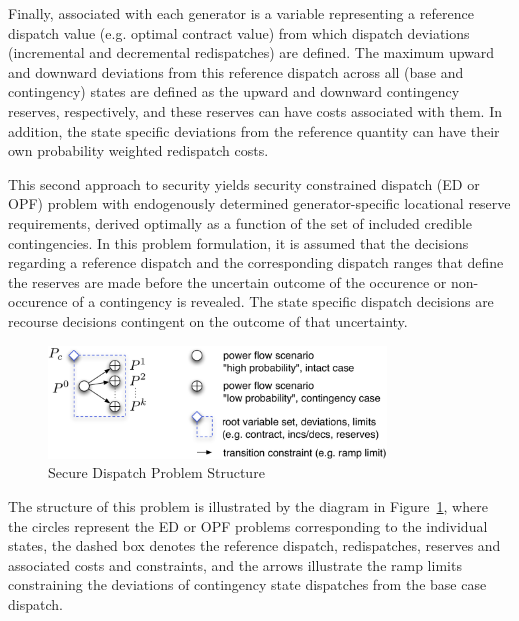 \documentclass[12pt]{article}
\numberwithin{equation}{section}
\numberwithin{table}{section}
\numberwithin{figure}{section}
\begin{document}
Finally, associated with each generator is a variable representing a reference dispatch value (e.g. optimal contract value) from which dispatch deviations (incremental and decremental redispatches) are defined. The maximum upward and downward deviations from this reference dispatch across all (base and contingency) states are defined as the upward and downward contingency reserves, respectively, and these reserves can have costs associated with them. In addition, the state specific deviations from the reference quantity can have their own probability weighted redispatch costs.

This second approach to security yields security constrained dispatch (ED or OPF) problem with endogenously determined generator-specific locational reserve requirements, derived optimally as a function of the set of included credible contingencies. In this problem formulation, it is assumed that the decisions regarding a reference dispatch and the corresponding dispatch ranges that define the reserves are made before the uncertain outcome of the occurence or non-occurence of a contingency is revealed. The state specific dispatch decisions are recourse decisions contingent on the outcome of that uncertainty.

\begin{figure}[hbtp]
  \centering
  \includegraphics[width=0.8\textwidth]{./figures/structure}
  \caption{Secure Dispatch Problem Structure}
  \label{fig:secure_dispatch_structure}
\end{figure}

The structure of this problem is illustrated by the diagram in Figure~\ref{fig:secure_dispatch_structure}, where the circles represent the ED or OPF problems corresponding to the individual states, the dashed box denotes the reference dispatch, redispatches, reserves and associated costs and constraints, and the arrows illustrate the ramp limits constraining the deviations of contingency state dispatches from the base case dispatch.
\end{document}

